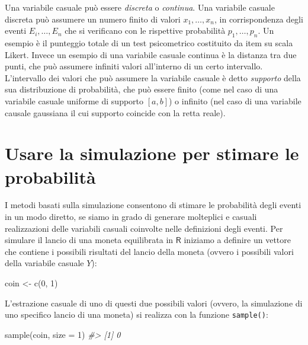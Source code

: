\documentclass[
  11pt,
]{krantz}
\makeatletter
\newenvironment{Shaded}{\begin{snugshade}}{\end{snugshade}}
\newcommand{\AttributeTok}[1]{\textcolor[rgb]{0.61,0.61,0.61}{#1}}
\newcommand{\CommentTok}[1]{\textcolor[rgb]{0.37,0.37,0.37}{\textit{#1}}}
\newcommand{\DecValTok}[1]{\textcolor[rgb]{0.06,0.06,0.06}{#1}}
\newcommand{\FunctionTok}[1]{\textcolor[rgb]{0,0,0}{#1}}
\newcommand{\NormalTok}[1]{#1}
\newcommand{\OtherTok}[1]{\textcolor[rgb]{0.37,0.37,0.37}{#1}}
\newenvironment{kframe}{%
\medskip{}
\setlength{\fboxsep}{.8em}
 \def\at@end@of@kframe{}%
 \ifinner\ifhmode%
  \def\at@end@of@kframe{\end{minipage}}%
  \begin{minipage}{\columnwidth}%
 \fi\fi%
 \def\FrameCommand##1{\hskip\@totalleftmargin \hskip-\fboxsep
 \colorbox{shadecolor}{##1}\hskip-\fboxsep
     \hskip-\linewidth \hskip-\@totalleftmargin \hskip\columnwidth}%
 \MakeFramed {\advance\hsize-\width
   \@totalleftmargin\z@ \linewidth\hsize
   \@setminipage}}%
 {\par\unskip\endMakeFramed%
 \at@end@of@kframe}
\renewenvironment{Shaded}{\begin{kframe}}{\end{kframe}}
\newcommand{\R}{\textsf{R}} %
\theoremstyle{definition}
\theoremstyle{definition}
\theoremstyle{definition}
\theoremstyle{definition}
\theoremstyle{remark}
\makeatother
\begin{document}
Una variabile casuale può essere \emph{discreta} o \emph{continua}. Una variabile casuale discreta può assumere un numero finito di valori \(x_1, \dots ,x_n\), in corrispondenza degli eventi \(E_i, \dots, E_n\) che si verificano con le rispettive probabilità \(p_1, \dots, p_n\). Un esempio è il punteggio totale di un test psicometrico costituito da item su scala Likert. Invece un esempio di una variabile casuale continua è la distanza tra due punti, che può assumere infiniti valori all'interno di un certo intervallo. L'intervallo dei valori che può assumere la variabile casuale è detto \emph{supporto} della sua distribuzione di probabilità, che può essere finito (come nel caso di una variabile casuale uniforme di supporto \([a, b]\)) o infinito (nel caso di una variabile causale gaussiana il cui supporto coincide con la retta reale).

\hypertarget{usare-la-simulazione-per-stimare-le-probabilituxe0}{%
\section{Usare la simulazione per stimare le probabilità}\label{usare-la-simulazione-per-stimare-le-probabilituxe0}}

I metodi basati sulla simulazione consentono di stimare le probabilità degli eventi in un modo diretto, se siamo in grado di generare molteplici e casuali realizzazioni delle variabili casuali coinvolte nelle definizioni degli eventi. Per simulare il lancio di una moneta equilibrata in \(\R\) iniziamo a definire un vettore che contiene i possibili risultati del lancio della moneta (ovvero i possibili valori della variabile casuale \(Y\)):

\begin{Shaded}
\begin{Highlighting}[]
\NormalTok{coin }\OtherTok{\textless{}{-}} \FunctionTok{c}\NormalTok{(}\DecValTok{0}\NormalTok{, }\DecValTok{1}\NormalTok{)}
\end{Highlighting}
\end{Shaded}

\noindent L'estrazione casuale di uno di questi due possibili valori (ovvero, la simulazione di uno specifico lancio di una moneta) si realizza con la funzione \texttt{sample()}:

\begin{Shaded}
\begin{Highlighting}[]
\FunctionTok{sample}\NormalTok{(coin, }\AttributeTok{size =} \DecValTok{1}\NormalTok{)}
\CommentTok{\#\textgreater{} [1] 0}
\end{Highlighting}
\end{Shaded}
\end{document}
